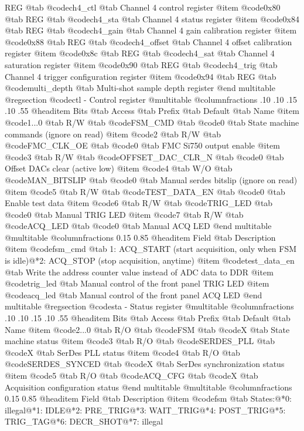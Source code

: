 REG @tab
@code{ch4_ctl} @tab
Channel 4 control register
@item @code{0x80} @tab
REG @tab
@code{ch4_sta} @tab
Channel 4 status register
@item @code{0x84} @tab
REG @tab
@code{ch4_gain} @tab
Channel 4 gain calibration register
@item @code{0x88} @tab
REG @tab
@code{ch4_offset} @tab
Channel 4 offset calibration register
@item @code{0x8c} @tab
REG @tab
@code{ch4_sat} @tab
Channel 4 saturation register
@item @code{0x90} @tab
REG @tab
@code{ch4_trig} @tab
Channel 4 trigger configuration register
@item @code{0x94} @tab
REG @tab
@code{multi_depth} @tab
Multi-shot sample depth register
@end multitable 
@regsection @code{ctl} - Control register
@multitable @columnfractions .10 .10 .15 .10 .55
@headitem Bits @tab Access @tab Prefix @tab Default @tab Name
@item @code{1...0}
@tab R/W @tab
@code{FSM_CMD}
@tab @code{0} @tab 
State machine commands (ignore on read)
@item @code{2}
@tab R/W @tab
@code{FMC_CLK_OE}
@tab @code{0} @tab 
FMC Si750 output enable
@item @code{3}
@tab R/W @tab
@code{OFFSET_DAC_CLR_N}
@tab @code{0} @tab 
Offset DACs clear (active low)
@item @code{4}
@tab W/O @tab
@code{MAN_BITSLIP}
@tab @code{0} @tab 
Manual serdes bitslip (ignore on read)
@item @code{5}
@tab R/W @tab
@code{TEST_DATA_EN}
@tab @code{0} @tab 
Enable test data
@item @code{6}
@tab R/W @tab
@code{TRIG_LED}
@tab @code{0} @tab 
Manual TRIG LED
@item @code{7}
@tab R/W @tab
@code{ACQ_LED}
@tab @code{0} @tab 
Manual ACQ LED
@end multitable
@multitable @columnfractions 0.15 0.85
@headitem Field @tab Description
@item @code{fsm_cmd} @tab 1: ACQ_START (start acquisition, only when FSM is idle)@*2: ACQ_STOP (stop acquisition, anytime)
@item @code{test_data_en} @tab Write the address counter value instead of ADC data to DDR
@item @code{trig_led} @tab Manual control of the front panel TRIG LED
@item @code{acq_led} @tab Manual control of the front panel ACQ LED
@end multitable
@regsection @code{sta} - Status register
@multitable @columnfractions .10 .10 .15 .10 .55
@headitem Bits @tab Access @tab Prefix @tab Default @tab Name
@item @code{2...0}
@tab R/O @tab
@code{FSM}
@tab @code{X} @tab 
State machine status
@item @code{3}
@tab R/O @tab
@code{SERDES_PLL}
@tab @code{X} @tab 
SerDes PLL status
@item @code{4}
@tab R/O @tab
@code{SERDES_SYNCED}
@tab @code{X} @tab 
SerDes synchronization status
@item @code{5}
@tab R/O @tab
@code{ACQ_CFG}
@tab @code{X} @tab 
Acquisition configuration status
@end multitable
@multitable @columnfractions 0.15 0.85
@headitem Field @tab Description
@item @code{fsm} @tab States:@*0: illegal@*1: IDLE@*2: PRE_TRIG@*3: WAIT_TRIG@*4: POST_TRIG@*5: TRIG_TAG@*6: DECR_SHOT@*7: illegal
